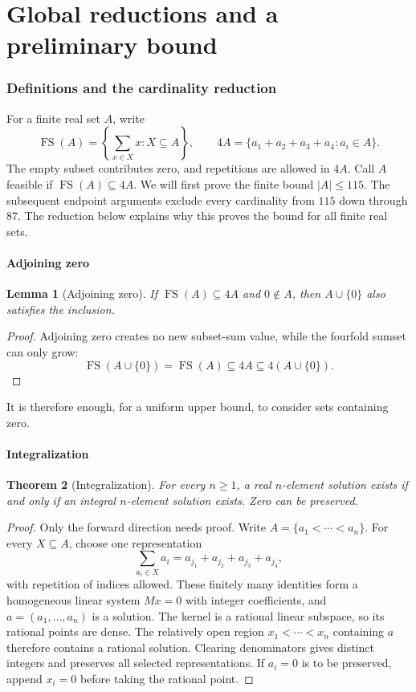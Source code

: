 \documentclass[11pt,a4paper]{article}
\newtheorem{theorem}{Theorem}[section]
\newtheorem{lemma}[theorem]{Lemma}
\theoremstyle{remark}
\newcommand{\FS}{\operatorname{FS}}
\begin{document}
\clearpage\part{Global reductions and a preliminary bound}\label{part:foundations}

\section{Definitions and the cardinality reduction}\label{base:sec:global-reduction}
For a finite real set $A$, write
\[
 \FS(A)=\left\{\sum_{x\in X}x:X\subseteq A\right\},\qquad
 4A=\{a_1+a_2+a_3+a_4:a_i\in A\}.
\]
The empty subset contributes zero, and repetitions are allowed in $4A$.
Call $A$ feasible if $\FS(A)\subseteq4A$. We will first prove the finite
bound $|A|\le115$. The subsequent endpoint arguments exclude every
cardinality from $115$ down through $87$. The reduction below explains why
this proves the bound for all finite real sets.

\subsection{Adjoining zero}

\begin{lemma}[Adjoining zero]\label{base:lem:add-zero}
If $\FS(A)\subseteq4A$ and $0\notin A$, then $A\cup\{0\}$ also satisfies the
inclusion.
\end{lemma}

\begin{proof}
Adjoining zero creates no new subset-sum value, while the fourfold sumset can
only grow:
\[
 \FS(A\cup\{0\})=\FS(A)\subseteq4A\subseteq4(A\cup\{0\}).
\]
\end{proof}

It is therefore enough, for a uniform upper bound, to consider sets containing
zero.

\subsection{Integralization}

\begin{theorem}[Integralization]\label{base:thm:integerization}
For every $n\geq1$, a real $n$-element solution exists if and only if an
integral $n$-element solution exists.  Zero can be preserved.
\end{theorem}

\begin{proof}
Only the forward direction needs proof.  Write
$A=\{a_1<\cdots<a_n\}$.  For every $X\subseteq A$, choose one representation
\[
 \sum_{a_i\in X}a_i=a_{j_1}+a_{j_2}+a_{j_3}+a_{j_4},
\]
with repetition of indices allowed.  These finitely many identities form a
homogeneous linear system $Mx=0$ with integer coefficients, and
$a=(a_1,\ldots,a_n)$ is a solution.  The kernel is a rational linear
subspace, so its rational points are dense.  The relatively open region
$x_1<\cdots<x_n$ containing $a$ therefore contains a rational solution.
Clearing denominators gives distinct integers and preserves all selected
representations.  If $a_i=0$ is to be preserved, append $x_i=0$ before taking
the rational point.
\end{proof}
\end{document}
